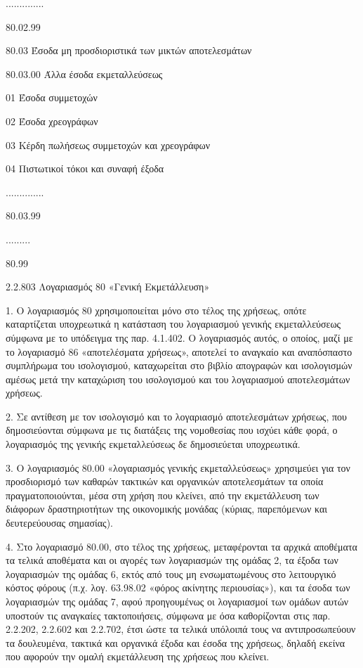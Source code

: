 \documentclass[A4,10pt,greek]{book}
\begin{document}
                     ..............

                     80.02.99

        80.03    Έσοδα μη προσδιοριστικά των μικτών αποτελεσμάτων

                     80.03.00    Άλλα έσοδα εκμεταλλεύσεως

                               01    Έσοδα συμμετοχών

                               02    Έσοδα χρεογράφων

                               03    Κέρδη πωλήσεως συμμετοχών και χρεογράφων

                               04    Πιστωτικοί τόκοι και συναφή έξοδα

                     ..............

                     80.03.99

         .........

         80.99

2.2.803 Λογαριασμός 80 «Γενική Εκμετάλλευση»

1. Ο λογαριασμός 80 χρησιμοποιείται μόνο στο τέλος της χρήσεως, οπότε καταρτίζεται υποχρεωτικά η κατάσταση του λογαριασμού γενικής εκμεταλλεύσεως σύμφωνα με το υπόδειγμα της παρ. 4.1.402. Ο λογαριασμός αυτός, ο οποίος, μαζί με το λογαριασμό 86 «αποτελέσματα χρήσεως», αποτελεί το αναγκαίο και αναπόσπαστο συμπλήρωμα του ισολογισμού, καταχωρείται στο βιβλίο απογραφών και ισολογισμών αμέσως μετά την καταχώριση του ισολογισμού και του λογαριασμού αποτελεσμάτων χρήσεως.

2. Σε αντίθεση με τον ισολογισμό και το λογαριασμό αποτελεσμάτων χρήσεως, που δημοσιεύονται σύμφωνα με τις διατάξεις της νομοθεσίας που ισχύει κάθε φορά, ο λογαριασμός της γενικής εκμεταλλεύσεως δε δημοσιεύεται υποχρεωτικά.

3. Ο λογαριασμός 80.00 «λογαριασμός γενικής εκμεταλλεύσεως» χρησιμεύει για τον προσδιορισμό των καθαρών τακτικών και οργανικών αποτελεσμάτων τα οποία πραγματοποιούνται, μέσα στη χρήση που κλείνει, από την εκμετάλλευση των διάφορων δραστηριοτήτων της οικονομικής μονάδας (κύριας, παρεπόμενων και δευτερεύουσας σημασίας).

4. Στο λογαριασμό 80.00, στο τέλος της χρήσεως, μεταφέρονται τα αρχικά αποθέματα τα τελικά αποθέματα και οι αγορές των λογαριασμών της ομάδας 2, τα έξοδα των λογαριασμών της ομάδας 6, εκτός από τους μη ενσωματωμένους στο λειτουργικό κόστος φόρους (π.χ. λογ. 63.98.02 «φόρος ακίνητης περιουσίας»), και τα έσοδα των λογαριασμών της ομάδας 7, αφού προηγουμένως οι λογαριασμοί των ομάδων αυτών υποστούν τις αναγκαίες τακτοποιήσεις, σύμφωνα με όσα καθορίζονται στις παρ. 2.2.202, 2.2.602 και 2.2.702, έτσι ώστε τα τελικά υπόλοιπά τους να αντιπροσωπεύουν τα δουλευμένα, τακτικά και οργανικά έξοδα και έσοδα της χρήσεως, δηλαδή εκείνα που αφορούν την ομαλή εκμετάλλευση της χρήσεως που κλείνει.
\end{document}
